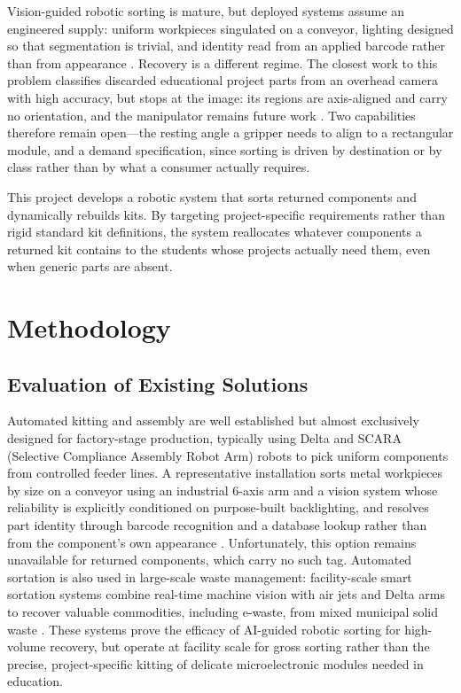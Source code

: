 \documentclass[conference]{IEEEtran}
\begin{document}
Vision-guided robotic sorting is mature, but deployed systems assume an engineered supply: uniform workpieces singulated on a conveyor, lighting designed so that segmentation is trivial, and identity read from an applied barcode rather than from appearance \cite{luo2024}. Recovery is a different regime. The closest work to this problem classifies discarded educational project parts from an overhead camera with high accuracy, but stops at the image: its regions are axis-aligned and carry no orientation, and the manipulator remains future work \cite{chand2022}. Two capabilities therefore remain open---the resting angle a gripper needs to align to a rectangular module, and a demand specification, since sorting is driven by destination or by class rather than by what a consumer actually requires.

This project develops a robotic system that sorts returned components and dynamically rebuilds kits. By targeting project-specific requirements rather than rigid standard kit definitions, the system reallocates whatever components a returned kit contains to the students whose projects actually need them, even when generic parts are absent.

\section{Methodology}
\subsection{Evaluation of Existing Solutions}
Automated kitting and assembly are well established but almost exclusively designed for factory-stage production, typically using Delta and SCARA (Selective Compliance Assembly Robot Arm) robots to pick uniform components from controlled feeder lines. A representative installation sorts metal workpieces by size on a conveyor using an industrial 6-axis arm and a vision system whose reliability is explicitly conditioned on purpose-built backlighting, and resolves part identity through barcode recognition and a database lookup rather than from the component's own appearance \cite{luo2024}. Unfortunately, this option remains unavailable for returned components, which carry no such tag. Automated sortation is also used in large-scale waste management: facility-scale smart sortation systems combine real-time machine vision with air jets and Delta arms to recover valuable commodities, including e-waste, from mixed municipal solid waste \cite{amp}. These systems prove the efficacy of AI-guided robotic sorting for high-volume recovery, but operate at facility scale for gross sorting rather than the precise, project-specific kitting of delicate microelectronic modules needed in education.
\end{document}

